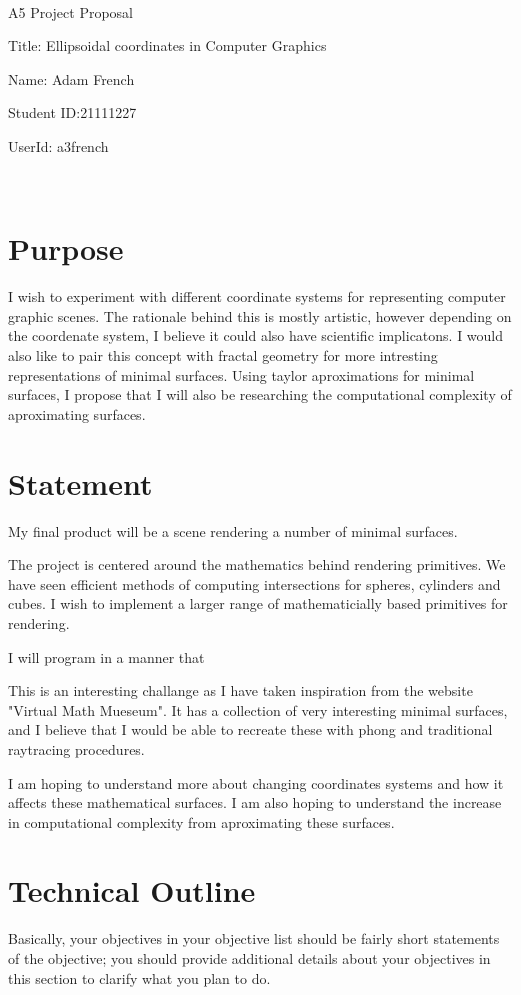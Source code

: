 \documentclass {article}
\begin{document}
~\vfill
\begin{center}
\Large

A5 Project Proposal

Title: Ellipsoidal coordinates in Computer Graphics

Name: Adam French

Student ID:21111227

UserId: a3french
\end{center}
\vfill ~\vfill~
\newpage
\section{Purpose}
     I wish to experiment with different coordinate systems for representing computer graphic scenes.
     The rationale behind this is mostly artistic, however depending on the coordenate system, I believe it could also have scientific implicatons.
     I would also like to pair this concept with fractal geometry for more intresting representations of minimal surfaces.
     Using taylor aproximations for minimal surfaces, I propose that I will also be researching the computational complexity of aproximating surfaces.
     

\section{Statement}
     My final product will be a scene rendering a number of minimal surfaces.

	The project is centered around the mathematics behind rendering primitives.
	We have seen efficient methods of computing intersections for spheres, cylinders and cubes.
	I wish to implement a larger range of mathematicially based primitives for rendering.

	I will program in a manner that

	This is an interesting challange as I have taken inspiration from the website "Virtual Math Mueseum".
	It has a collection of very interesting minimal surfaces, and I believe that I would be able to recreate these with phong and traditional raytracing procedures.

	I am hoping to understand more about changing coordinates systems and how it affects these mathematical surfaces.
     I am also hoping to understand the increase in computational complexity from aproximating these surfaces.

\section{Technical Outline}
    Basically, your objectives in your objective list should be fairly
    short statements of the objective; you should provide additional
    details about your objectives in this section to clarify what you
    plan to do.
\end{document}
